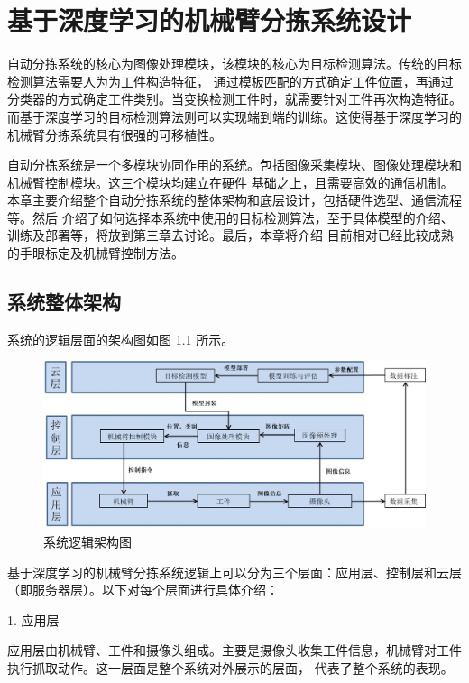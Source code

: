 
\chapter{基于深度学习的机械臂分拣系统设计}

自动分拣系统的核心为图像处理模块，该模块的核心为目标检测算法。传统的目标检测算法需要人为为工件构造特征，
通过模板匹配的方式确定工件位置，再通过分类器的方式确定工件类别。当变换检测工件时，就需要针对工件再次构造特征。
而基于深度学习的目标检测算法则可以实现端到端的训练。这使得基于深度学习的机械臂分拣系统具有很强的可移植性。

自动分拣系统是一个多模块协同作用的系统。包括图像采集模块、图像处理模块和机械臂控制模块。这三个模块均建立在硬件
基础之上，且需要高效的通信机制。本章主要介绍整个自动分拣系统的整体架构和底层设计，包括硬件选型、通信流程等。然后
介绍了如何选择本系统中使用的目标检测算法，至于具体模型的介绍、训练及部署等，将放到第三章去讨论。最后，本章将介绍
目前相对已经比较成熟的手眼标定及机械臂控制方法。

\section{系统整体架构}

系统的逻辑层面的架构图如图    \ref{fig:total_construct}
所示。

\begin{figure}[htbp]
    \centering
    \includegraphics[width=\textwidth]{pic/chap2/total_construct.jpg}
    \caption{系统逻辑架构图}
    \label{fig:total_construct}
\end{figure}

基于深度学习的机械臂分拣系统逻辑上可以分为三个层面：应用层、控制层和云层（即服务器层）。以下对每个层面进行具体介绍：

1. 应用层

应用层由机械臂、工件和摄像头组成。主要是摄像头收集工件信息，机械臂对工件执行抓取动作。这一层面是整个系统对外展示的层面，
代表了整个系统的表现。

